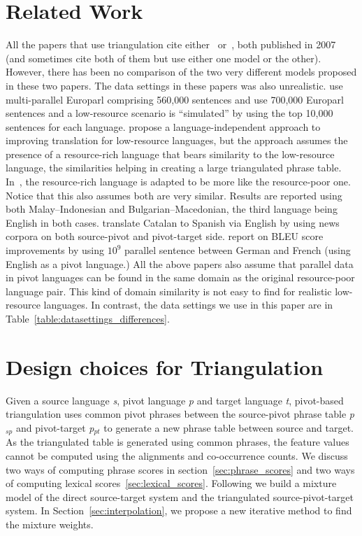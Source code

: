 \documentclass[11pt]{article}
\begin{document}
\section{Related Work}
	All the papers that use triangulation cite either~\cite{Utiyama:07} or~\cite{Cohn:07}, both published in 2007 (and sometimes cite both of them but use either one model or the other). However, there has been no comparison of the two very different models proposed in these two papers. The data settings in these papers was also unrealistic. \cite{Utiyama:07} use multi-parallel Europarl comprising 560,000 sentences and \cite{Cohn:07} use 700,000 Europarl sentences and a low-resource scenario is ``simulated'' by using the top 10,000 sentences for each language. \cite{Nakov:12} propose a language-independent approach to improving translation for low-resource languages, but the approach assumes the presence of a resource-rich language that bears similarity to the low-resource language, the similarities helping in creating a large triangulated phrase table. In~\cite{Nakovemnlp:12}, the resource-rich language is adapted to be more like the resource-poor one. Notice that this also assumes both are very similar. Results are reported using both Malay--Indonesian and Bulgarian--Macedonian, the third language being English in both cases. \cite{Gispert:06} translate Catalan to Spanish via English by using news corpora on both source-pivot and pivot-target side. \cite{Huck:12} report on BLEU score improvements by using $10^9$ parallel sentence between German and French (using English as a pivot language.) All the above papers also assume that parallel data in pivot languages can be found in the same domain as the original resource-poor language pair. This kind of domain similarity is not easy to find for realistic low-resource languages. In contrast, the data settings we use in this paper are in Table~\ref{table:datasettings_differences}. 

\section{Design choices for Triangulation}
\label{sec:models}
	
	Given a source language \emph{s}, pivot language \emph{p} and target language \emph{t}, pivot-based triangulation uses common pivot phrases between the source-pivot phrase table \emph{p$_{sp}$} and pivot-target \emph{p$_{pt}$} to generate a new phrase table between source and target. As the triangulated table is generated using common phrases, the feature values cannot be computed using the alignments and co-occurrence counts. We discuss two ways of computing phrase scores in section~\ref{sec:phrase_scores} and two ways of computing lexical scores~\ref{sec:lexical_scores}. Following \cite{Cohn:07} we build a mixture model of the direct source-target system and the triangulated source-pivot-target system. In Section~\ref{sec:interpolation}, we propose a new iterative method to find the mixture weights.
\end{document}
